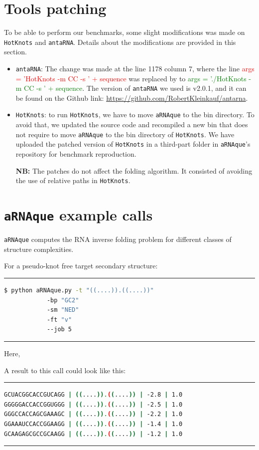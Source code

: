 \section{Tools patching}
\label{app:b5}
To be able to perform our benchmarks, some slight modifications was made on \texttt{HotKnots} and \texttt{antaRNA}. Details about the modifications are provided in this section.
\begin{itemize}
	\item \texttt{antaRNA}: The change was made at the line 1178 column 7, where the line \textcolor{red}{args = 'HotKnots -m CC -s ' + sequence} was replaced by to \textcolor{green}{args = './HotKnots -m CC -s ' + sequence}. The version of \texttt{antaRNA} we used is v2.0.1, and it can be found on the Github link: 
	\url{https://github.com/RobertKleinkauf/antarna}.
	\item \texttt{HotKnots}: to run \texttt{HotKnots}, we have to move \texttt{aRNAque} to the bin directory. To avoid that, we updated the source code and recompiled a new bin that does not require to move \texttt{aRNAque} to the bin directory of \texttt{HotKnots}. We have uploaded the patched version of \texttt{HotKnots} in a third-part folder in \texttt{aRNAque}'s repository for benchmark reproduction.
	
	\textbf{NB:} The patches do not affect the folding algorithm. It consisted of avoiding the use of relative paths in \texttt{HotKnots}. 
\end{itemize}


\section{\texttt{aRNAque} example calls}
\label{app:b6}
\texttt{aRNAque} computes the RNA inverse folding problem for different classes of structure complexities. 


\noindent For a pseudo-knot free target secondary structure: 

\noindent \rule{12cm}{0.4pt}
\begin{lstlisting}[language=bash, caption={Command line to run \texttt{aRNAque} python script}]
$ python aRNAque.py -t "((....)).((....))"   
			-bp "GC2"
			-sm "NED" 
			-ft "v"
			--job 5
\end{lstlisting}
\rule{12cm}{0.4pt}

\noindent Here, 


\noindent A result to this call could look like this: 

\noindent \rule{12cm}{0.4pt}
\begin{lstlisting}[language=bash, caption={\texttt{aRNAque}'s output results}]
GCUACGGCACCGUCAGG | ((....)).((....)) | -2.8 | 1.0
GGGGGACCACCGGUGGG | ((....)).((....)) | -2.5 | 1.0
GGGCCACCAGCGAAAGC | ((....)).((....)) | -2.2 | 1.0
GGAAAUCCACCGGAAGG | ((....)).((....)) | -1.4 | 1.0
GCAAGAGCGCCGCAAGG | ((....)).((....)) | -1.2 | 1.0
\end{lstlisting}
\noindent \rule{12cm}{0.4pt}

